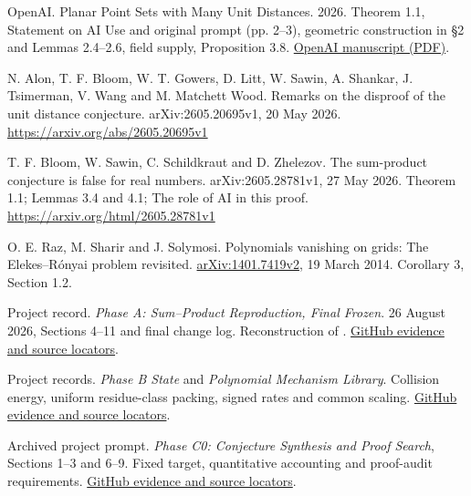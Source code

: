 OpenAI. Planar Point Sets with Many Unit Distances. 2026. Theorem 1.1, Statement on AI Use and original prompt (pp. 2--3), geometric construction in \S{}2 and Lemmas 2.4--2.6, field supply, Proposition 3.8. \href{https://cdn.openai.com/pdf/74c24085-19b0-4534-9c90-465b8e29ad73/unit-distance-proof.pdf}{OpenAI manuscript (PDF)}.

N. Alon, T. F. Bloom, W. T. Gowers, D. Litt, W. Sawin, A. Shankar, J. Tsimerman, V. Wang and M. Matchett Wood. Remarks on the disproof of the unit distance conjecture. arXiv:2605.20695v1, 20 May 2026. \url{https://arxiv.org/abs/2605.20695v1}

T. F. Bloom, W. Sawin, C. Schildkraut and D. Zhelezov. The sum-product conjecture is false for real numbers. arXiv:2605.28781v1, 27 May 2026. Theorem 1.1; Lemmas 3.4 and 4.1; The role of AI in this proof. \url{https://arxiv.org/html/2605.28781v1}

O. E. Raz, M. Sharir and J. Solymosi. Polynomials vanishing on grids: The Elekes--Rónyai problem revisited. \href{https://arxiv.org/abs/1401.7419v2}{arXiv:1401.7419v2}, 19 March 2014. Corollary 3, Section 1.2.

Project record. \emph{Phase A: Sum--Product Reproduction, Final Frozen}. 26 August 2026, Sections 4--11 and final change log. Reconstruction of \cite{ref3}. \href{https://github.com/hnt119/polynomial-image-compression/blob/bd1f2d663262821575eebdfa559b7c25f76b46ab/research/exports/2026-11-05-report-references/README.md#ref5}{GitHub evidence and source locators}.

Project records. \emph{Phase B State} and \emph{Polynomial Mechanism Library}. Collision energy, uniform residue-class packing, signed rates and common scaling. \href{https://github.com/hnt119/polynomial-image-compression/blob/bd1f2d663262821575eebdfa559b7c25f76b46ab/research/exports/2026-11-05-report-references/README.md#ref6}{GitHub evidence and source locators}.

Archived project prompt. \emph{Phase C0: Conjecture Synthesis and Proof Search}, Sections 1--3 and 6--9. Fixed target, quantitative accounting and proof-audit requirements. \href{https://github.com/hnt119/polynomial-image-compression/blob/bd1f2d663262821575eebdfa559b7c25f76b46ab/research/exports/2026-11-05-report-references/README.md#ref7}{GitHub evidence and source locators}.

